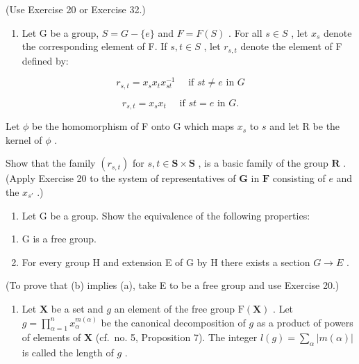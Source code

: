 (Use Exercise 20 or Exercise 32.)

\begin{enumerate}
\def\labelenumi{\arabic{enumi}.}
\setcounter{enumi}{23}
\tightlist
\item
  Let G be a group, \(S = G - \{e\}\) and \(F = F(S)\) . For all \(s \in S\) , let \(x_s\) denote the corresponding element of F. If \(s, t \in S\) , let \(r_{s,t}\) denote the element of F defined by:
\end{enumerate}

\[
r _ {s, t} = x _ {s} x _ {t} x _ {s t} ^ {- 1} \quad \text { if } s t \neq e \text { in } G
\]

\[
r _ {s, t} = x _ {s} x _ {t} \quad \text { if } s t = e \text { in } G.
\]

Let \(\phi\) be the homomorphism of F onto G which maps \(x_{s}\) to \(s\) and let R be the kernel of \(\phi\) .

Show that the family \((r_{s,t})\) for \(s, t \in \mathbf{S} \times \mathbf{S}\) , is a basic family of the group \(\mathbf{R}\) . (Apply Exercise 20 to the system of representatives of \(\mathbf{G}\) in \(\mathbf{F}\) consisting of \(e\) and the \(x_{s'}\) .)

\begin{enumerate}
\def\labelenumi{\arabic{enumi}.}
\setcounter{enumi}{24}
\tightlist
\item
  Let G be a group. Show the equivalence of the following properties:
\end{enumerate}

\begin{enumerate}
\def\labelenumi{(\alph{enumi})}
\item
  G is a free group.
\item
  For every group H and extension E of G by H there exists a section \(G \rightarrow E\) .
\end{enumerate}

(To prove that (b) implies (a), take E to be a free group and use Exercise 20.)

\begin{enumerate}
\def\labelenumi{\arabic{enumi}.}
\setcounter{enumi}{25}
\tightlist
\item
  Let \(\mathbf{X}\) be a set and \(g\) an element of the free group \(\mathrm{F}(\mathbf{X})\) . Let \(g = \prod_{\alpha=1}^{n} x_{\alpha}^{m(\alpha)}\) be the canonical decomposition of \(g\) as a product of powers of elements of \(\mathbf{X}\) (cf.~no. 5, Proposition 7). The integer \(l(g) = \sum_{\alpha} |m(\alpha)|\) is called the length of \(g\) .
\end{enumerate}

